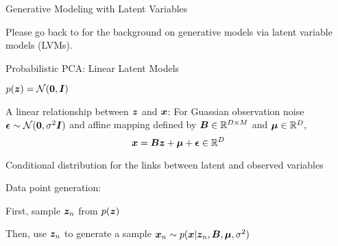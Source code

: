 \documentclass[handout,fleqn,aspectratio=169]{beamer}
\begin{document}
\begin{frame}{Generative Modeling with Latent Variables}

\vspace{2cm}
\LARGE Please go back to  for the background on generative models via latent variable models (LVMs).





\end{frame}

\begin{frame}{Probabilistic PCA: Linear Latent Models}

\plitemsep 0.07in

\bci 
\item $p(\bm{z}) = \mathcal N(\bm{0},\bm{I})$

\item A linear relationship between $\bm{z}$ and $\bm{x}$: For Guassian observation noise $\bm{\epsilon} \sim \mathcal N(\bm{0},\sigma^2 \bm{I})$ and affine mapping defined by $\bm{B} \in {\mathbb R}^{D \times M}$ and $\bm{\mu} \in {\mathbb R}^{D},$
$$
\bm{x} = \bm{B}\bm{z} + \bm{\mu} + \bm{\epsilon} \in {\mathbb R}^{D}
$$

\item Conditional distribution for the links between latent and observed variables
\item Data point generation: 
\bci
\item First, sample $\bm{z}_n$ from $p(\bm{z})$
\item Then, use $\bm{z}_n$ to generate a sample $\bm{x}_n \sim p(\bm{x}|\bm{z}_n, \bm{B}, \bm{\mu}, \sigma^2)$
\eci
\eci

\end{frame}
\end{document}
